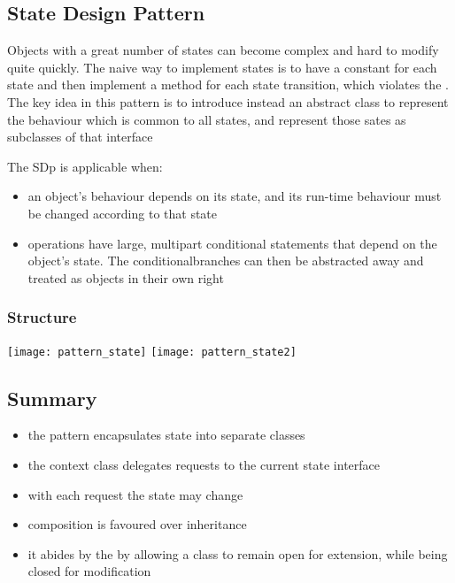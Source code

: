
\subsection{State Design Pattern}




	\par{Objects with a great number of states can become complex and hard to modify quite quickly. The naive way to implement states is to have a constant for each state and then implement a method for each state transition, which violates the . The key idea in this pattern is to introduce instead an abstract class to represent the behaviour which is common to all states, and represent those sates as subclasses of that interface}




		\par{The SDp is applicable when:}

		\begin{itemize}
			\item{an object's behaviour depends on its state, and its run-time behaviour must be changed according to that state}

			\item{operations have large, multipart conditional statements that depend on the object's state. The conditionalbranches can then be abstracted away and treated as objects in their own right}
		\end{itemize}

	\subsubsection{Structure}

		\texttt{[image: pattern\_state]}
		\texttt{[image: pattern\_state2]}

	\subsection{Summary}

		\begin{itemize}
			\item the pattern encapsulates state into separate classes
			\item the context class delegates requests to the current state interface
			\item with each request the state may change
			\item composition is favoured over inheritance
			\item it abides by the  by allowing a class to remain open for extension, while being closed for modification
		\end{itemize}


